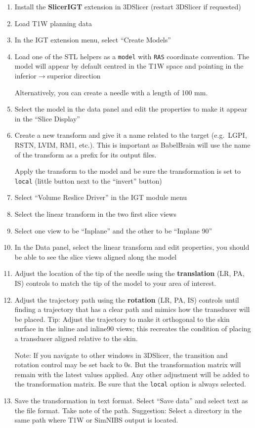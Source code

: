 \begin{enumerate}
\def\labelenumi{\arabic{enumi}.}
\item
  Install the \textbf{SlicerIGT} extension in 3DSlicer (restart 3DSlicer
  if requested)
\item
  Load T1W planning data
\item
  In the IGT extension menu, select ``Create Models''
\item
  Load one of the STL helpers as a \texttt{model} with \texttt{RAS}
  coordinate convention. The model will appear by default centred in the
  T1W space and pointing in the inferior\(\rightarrow\)superior
  direction

  Alternatively, you can create a needle with a length of 100 mm.
\item
  Select the model in the data panel and edit the properties to make it
  appear in the ``Slice Display''
\item
  Create a new transform and give it a name related to the target
  (e.g.~LGPI, RSTN, LVIM, RM1, etc.). This is important as BabelBrain
  will use the name of the transform as a prefix for its output files.

  Apply the transform to the model and be sure the transformation is set
  to \texttt{local} (little button next to the ``invert'' button)
\item
  Select ``Volume Reslice Driver'' in the IGT module menu
\item
  Select the linear transform in the two first slice views
\item
  Select one view to be ``Inplane'' and the other to be ``Inplane 90''
\item
  In the Data panel, select the linear transform and edit properties,
  you should be able to see the slice views aligned along the model
\item
  Adjust the location of the tip of the needle using the
  \textbf{translation} (LR, PA, IS) controls to match the tip of the
  model to your area of interest.
\item
  Adjust the trajectory path using the \textbf{rotation} (LR, PA, IS)
  controls until finding a trajectory that has a clear path and mimics
  how the transducer will be placed. Tip: Adjust the trajectory to make
  it orthogonal to the skin surface in the inline and inline90 views;
  this recreates the condition of placing a transducer aligned relative
  to the skin.

  Note: If you navigate to other windows in 3DSlicer, the transition and
  rotation control may be set back to 0s. But the transformation matrix
  will remain with the latest values applied. Any other adjustment will
  be added to the transformation matrix. Be sure that the \texttt{local}
  option is always selected.
\item
  Save the transformation in text format. Select ``Save data'' and
  select text as the file format. Take note of the path. Suggestion:
  Select a directory in the same path where T1W or SimNIBS output is
  located.
\end{enumerate}


